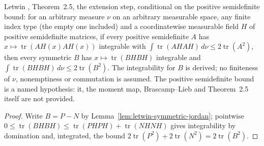 \begin{lemma}
  \label{lem:letwin-symmetric-integral}
  \leanok
  Letwin \cite{Letwin2026QuadraticKLS}, Theorem~2.5, the extension step, conditional on the positive semidefinite bound:
  for an arbitrary measure $\nu$ on an arbitrary measurable space, any finite index type (the empty one included) and a
  coordinatewise measurable field $H$ of positive semidefinite matrices, if every positive semidefinite $A$ has
  $x\mapsto\operatorname{tr}(AH(x)AH(x))$ integrable with $\int\operatorname{tr}(AHAH)\,d\nu\le2\operatorname{tr}(A^2)$,
  then every symmetric $B$ has $x\mapsto\operatorname{tr}(BHBH)$ integrable and
  $\int\operatorname{tr}(BHBH)\,d\nu\le2\operatorname{tr}(B^2)$.  The integrability for $B$ is derived; no finiteness of
  $\nu$, nonemptiness or commutation is assumed.  The positive semidefinite bound is a named hypothesis: it, the moment
  map, Brascamp--Lieb and Theorem~2.5 itself are not provided.
\end{lemma}
\begin{proof}
  \leanok
  Write $B=P-N$ by Lemma~\ref{lem:letwin-symmetric-jordan}; pointwise $0\le\operatorname{tr}(BHBH)\le
  \operatorname{tr}(PHPH)+\operatorname{tr}(NHNH)$ gives integrability by domination and, integrated, the bound
  $2\operatorname{tr}(P^2)+2\operatorname{tr}(N^2)=2\operatorname{tr}(B^2)$.
\end{proof}

